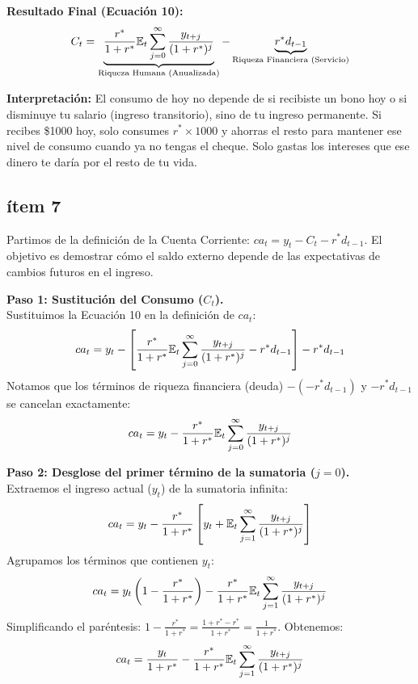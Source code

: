 \textbf{Resultado Final (Ecuación 10):}
\begin{equation}
    C_t = \underbrace{\frac{r^*}{1+r^*} \mathbb{E}_t \sum_{j=0}^{\infty} \frac{y_{t+j}}{(1+r^*)^j}}_{\text{Riqueza Humana (Anualizada)}} - \underbrace{r^* d_{t-1}}_{\text{Riqueza Financiera (Servicio)}}
\end{equation}

\textbf{Interpretación:} El consumo de hoy no depende de si recibiste un bono hoy o si disminuye tu salario (ingreso transitorio), sino de tu ingreso permanente. Si recibes \$1000 hoy, solo consumes $r^* \times 1000$ y ahorras el resto para mantener ese nivel de consumo cuando ya no tengas el cheque. Solo gastas los intereses que ese dinero te daría por el resto de tu vida.

\subsection*{ítem 7}

Partimos de la definición de la Cuenta Corriente: $ca_t = y_t - C_t - r^*d_{t-1}$. El objetivo es demostrar cómo el saldo externo depende de las expectativas de cambios futuros en el ingreso.

\textbf{Paso 1: Sustitución del Consumo ($C_t$).} \\
Sustituimos la Ecuación 10 en la definición de $ca_t$:
\begin{equation}
    ca_t = y_t - \left[ \frac{r^*}{1+r^*} \mathbb{E}_t \sum_{j=0}^{\infty} \frac{y_{t+j}}{(1+r^*)^j} - r^* d_{t-1} \right] - r^* d_{t-1}
\end{equation}
Notamos que los términos de riqueza financiera (deuda) $-(-r^* d_{t-1})$ y $-r^* d_{t-1}$ se cancelan exactamente:
\begin{equation}
    ca_t = y_t - \frac{r^*}{1+r^*} \mathbb{E}_t \sum_{j=0}^{\infty} \frac{y_{t+j}}{(1+r^*)^j}
\end{equation}

\textbf{Paso 2: Desglose del primer término de la sumatoria ($j=0$).} \\
Extraemos el ingreso actual ($y_t$) de la sumatoria infinita:
\begin{equation}
    ca_t = y_t - \frac{r^*}{1+r^*} \left[ y_t + \mathbb{E}_t \sum_{j=1}^{\infty} \frac{y_{t+j}}{(1+r^*)^j} \right]
\end{equation}
Agrupamos los términos que contienen $y_t$:
\begin{equation}
    ca_t = y_t \left( 1 - \frac{r^*}{1+r^*} \right) - \frac{r^*}{1+r^*} \mathbb{E}_t \sum_{j=1}^{\infty} \frac{y_{t+j}}{(1+r^*)^j}
\end{equation}
Simplificando el paréntesis: $1 - \frac{r^*}{1+r^*} = \frac{1+r^*-r^*}{1+r^*} = \frac{1}{1+r^*}$. Obtenemos:
\begin{equation}
    ca_t = \frac{y_t}{1+r^*} - \frac{r^*}{1+r^*} \mathbb{E}_t \sum_{j=1}^{\infty} \frac{y_{t+j}}{(1+r^*)^j}
\end{equation}

